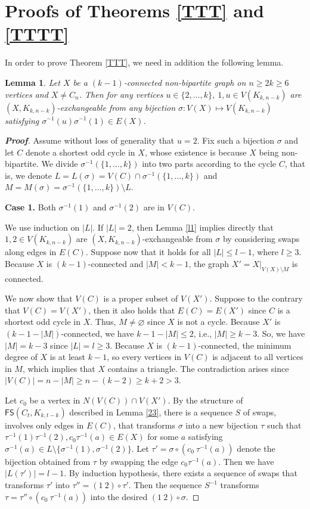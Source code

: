 \documentclass[11pt]{article}
\newtheorem{lem}[thm]{Lemma}%
\newcommand{\FS}{\mathsf{FS}}
\begin{document}
\section{Proofs of Theorems \ref{TTT} and  \ref{TTTT}}\label{s4}

In order to prove  Theorem \ref{TTT}, we need in addition the following lemma.
\begin{lem}\label{LL}
 Let $X$ be a $(k-1)$-connected non-bipartite graph on $n\ge 2k\ge 6$ vertices and $X \not=C_n$. Then for any vertices $u \in \{2,\dots,k\}$, $1,u \in V(K_{k,n-k})$ are $(X,K_{k,n-k})$-exchangeable from any bijection $\sigma:V(X)\mapsto V(K_{k,n-k})$ satisfying $\sigma^{-1}(u)\sigma^{-1}(1)\in E(X)$. 
\end{lem}
\begin{proof}[\bfseries{Proof}]
Assume without loss of generality that $u=2$.
Fix such a bijection $\sigma$ and let $C$ denote a shortest odd cycle in $X$,  whose existence is because $X$ being non-bipartite. We divide $\sigma^{-1}(\{1,\dots,k\})$ into two parts according to the cycle $C$, that is, we denote $L=L(\sigma)=V(C)\cap \sigma^{-1}(\{1,\dots,k\})$ and $M=M(\sigma)=\sigma^{-1}(\{1,\dots,k\}) \setminus L$. 

\vskip 2mm
\noindent\textbf{Case 1.} Both  $\sigma^{-1}(1)$ and $\sigma^{-1}(2)$ are in $V(C)$. 
\vskip 2mm

 We use induction on $|L|$. If $|L|=2$, then Lemma \ref{l1} implies directly that $1,2 \in V(K_{k,n-k})$ are $(X, K_{k,n-k})$-exchangeable from $\sigma$ by considering swaps along edges in $E(C)$. Suppose now that it holds for all $|L|\le l-1$, where $l\ge 3$.   Because $X$ is $(k-1)$-connected and $|M|<k-1$, the graph  $X'=X|_{V(X)\setminus M}$ is connected.
 
 We now show that $V(C)$ is a proper subset of $V(X')$. Suppose to the contrary that $V(C)=V(X')$, then it also holds that $E(C)=E(X')$ since $C$ is a shortest odd cycle in $X$. Thus, $M\neq \varnothing$ since $X$ is not a cycle. Because $X'$ is $(k-1-|M|)$-connected, we have $k-1-|M|\le 2$, i.e.,  $|M|\ge k-3$. So, we have $|M|=k-3$ since $|L|=l\ge 3$. Because $X$ is $(k-1)$-connected, the minimum degree of $X$ is at least $k-1$, so every vertices in $V(C)$ is adjacent to all vertices in $M$, which implies that $X$ contains a triangle. The contradiction arises since $|V(C)|= n-|M| \ge n-(k-2) \ge k+2 >3$.

 Let  $c_0$ be a vertex in $N(V(C))\cap V(X')$. By the structure of $\FS(C_t,K_{k,t-k})$ described in Lemma \ref{23}, there is a sequence  $S$  of swaps, involves only edges in $E(C)$, that transforms $\sigma$ into a new bijection $\tau$ such that $\tau^{-1}(1)\tau^{-1}(2), c_0 \tau^{-1}(a)\in E(X)$ for some $a$ satisfying $\sigma^{-1}(a) \in L\setminus \{\sigma^{-1}(1),\sigma^{-1}(2)\}$.  Let $\tau'=\sigma\circ(c_0\ \tau^{-1}(a))$ denote the bijection obtained from $\tau$ by swapping the edge $c_0 \tau^{-1}(a)$.  Then we have  $|L(\tau')|=l-1$. By induction hypothesis, there exists a sequence  of swaps that transforms $\tau'$ into $\tau''=(1 \ 2) \circ \tau'$. Then the sequence  $S^{-1}$ transforms $\tau=\tau'' \circ  (c_0\ \tau^{-1}(a))$ into the desired $(1\ 2)\circ \sigma$.


\end{proof}
\end{document}
